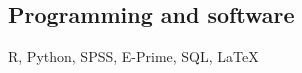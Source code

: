 \documentclass[margin, 11pt]{res} %
\begin{document}
\begin{resume}
\section{\sc Programming and software}

R, Python, SPSS, E-Prime, SQL, \LaTeX




%
%
 



%


\end{resume}
\end{document}

